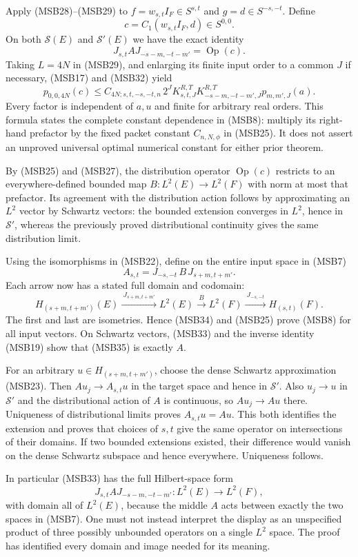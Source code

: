\documentclass[
  11pt,
]{article}
\begin{document}
Apply (MSB28)--(MSB29) to \(f=w_{s,t}I_F\in S^{s,t}\) and
\(g=d\in S^{-s,-t}\). Define \[
 c=C_1(w_{s,t}I_F,d)\in S^{0,0}.
\] On both \(\mathcal S(E)\) and \(\mathcal S'(E)\) we have the exact
identity \[
 J_{s,t}A J_{-s-m,-t-m'}=\operatorname{Op}(c).
 \tag{MSB33}
\] Taking \(L=4N\) in (MSB29), and enlarging its finite input order to a
common \(J\) if necessary, (MSB17) and (MSB32) yield \[
 p_{0,0,4N}(c)
 \leq C_{4N;s,t,-s,-t,n}\,2^J
      K^{R,T}_{s,t,J}K^{R,T}_{-s-m,-t-m',J}
      p_{m,m',J}(a).
 \tag{MSB34}
\] Every factor is independent of \(a,u\) and finite for arbitrary real
orders. This formula states the complete constant dependence in (MSB8):
multiply its right-hand prefactor by the fixed packet constant
\(C_{n,N,\phi}\) in (MSB25). It does not assert an unproved universal
optimal numerical constant for either prior theorem.

By (MSB25) and (MSB27), the distribution operator
\(\operatorname{Op}(c)\) restricts to an everywhere-defined bounded map
\(B:L^2(E)\to L^2(F)\) with norm at most that prefactor. Its agreement
with the distribution action follows by approximating an \(L^2\) vector
by Schwartz vectors: the bounded extension converges in \(L^2\), hence
in \(\mathcal S'\), whereas the previously proved distributional
continuity gives the same distribution limit.

Using the isomorphisms in (MSB22), define on the entire input space in
(MSB7) \[
 A_{s,t}=J_{-s,-t}\, B\, J_{s+m,t+m'}.
 \tag{MSB35}
\] Each arrow now has a stated full domain and codomain: \[
 H_{(s+m,t+m')}(E)\xrightarrow{\ J_{s+m,t+m'}\ }L^2(E)
 \xrightarrow{\ B\ }L^2(F)
 \xrightarrow{\ J_{-s,-t}\ }H_{(s,t)}(F).
\] The first and last are isometries. Hence (MSB34) and (MSB25) prove
(MSB8) for all input vectors. On Schwartz vectors, (MSB33) and the
inverse identity (MSB19) show that (MSB35) is exactly \(A\).

For an arbitrary \(u\in H_{(s+m,t+m')}\), choose the dense Schwartz
approximation (MSB23). Then \(Au_j\to A_{s,t}u\) in the target space and
hence in \(\mathcal S'\). Also \(u_j\to u\) in \(\mathcal S'\) and the
distributional action of \(A\) is continuous, so \(Au_j\to Au\) there.
Uniqueness of distributional limits proves \(A_{s,t}u=Au\). This both
identifies the extension and proves that choices of \(s,t\) give the
same operator on intersections of their domains. If two bounded
extensions existed, their difference would vanish on the dense Schwartz
subspace and hence everywhere. Uniqueness follows.

In particular (MSB33) has the full Hilbert-space form \[
 J_{s,t}A J_{-s-m,-t-m'}:L^2(E)\longrightarrow L^2(F),
\] with domain all of \(L^2(E)\), because the middle \(A\) acts between
exactly the two spaces in (MSB7). One must not instead interpret the
display as an unspecified product of three possibly unbounded operators
on a single \(L^2\) space. The proof has identified every domain and
image needed for its meaning.
\end{document}
